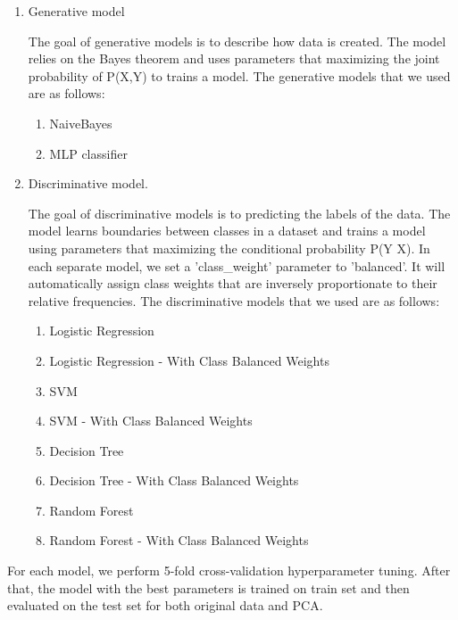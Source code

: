 \begin{enumerate}
    \item Generative model 
    
    The goal of generative models is to describe how data is created. The model relies on the Bayes theorem and uses parameters that maximizing the joint probability of P(X,Y) to trains a model. The generative models that we used are as follows:
    
    \begin{enumerate}
        \item NaiveBayes
        \item MLP classifier
    \end{enumerate}
    
    \item Discriminative model.
    
    The goal of discriminative models is to predicting the labels of the data. The model learns boundaries between classes in a dataset and trains a model using parameters that maximizing the conditional probability P(Y \textbar X). In each separate model, we set a 'class\_weight' parameter to 'balanced'. It will automatically assign class weights that are inversely proportionate to their relative frequencies. The discriminative models that we used are as follows:
    
    \begin{enumerate}
        \item Logistic Regression
        \item Logistic Regression - With Class Balanced Weights
        \item SVM
        \item SVM - With Class Balanced Weights
        \item Decision Tree
        \item Decision Tree - With Class Balanced Weights
        \item Random Forest
        \item Random Forest - With Class Balanced Weights
    \end{enumerate}
\end{enumerate}

For each model, we perform 5-fold cross-validation hyperparameter tuning. After that, the model with the best parameters is trained on train set and then evaluated on the test set for both original data and PCA.

